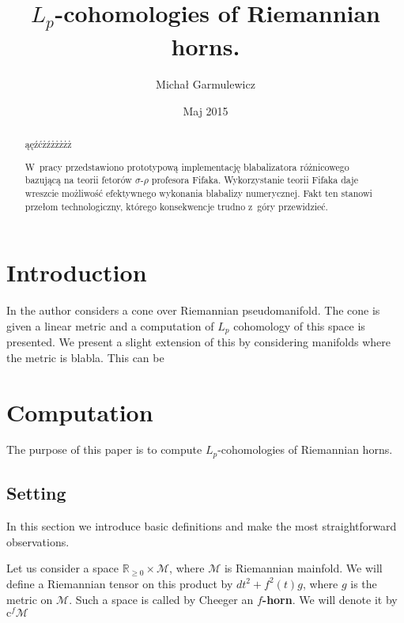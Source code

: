 \documentclass[licencjacka]{pracamgr}
\author{Michał Garmulewicz}
\title{$L_p$-cohomologies of Riemannian horns.}
\date{Maj 2015}
\begin{document}
\maketitle

\begin{abstract}
ąęźćżźżżżżż

  W~pracy przedstawiono prototypową implementację blabalizatora
  różnicowego bazującą na teorii fetorów $\sigma$-$\rho$ profesora
  Fifaka.  Wykorzystanie teorii Fifaka daje wreszcie możliwość
  efektywnego wykonania blabalizy numerycznej.  Fakt ten stanowi
  przełom technologiczny, którego konsekwencje trudno z~góry
  przewidzieć.
\end{abstract}

\tableofcontents

\chapter*{Introduction}

In \cite{weber} the author considers a cone over Riemannian pseudomanifold.
The cone is given a linear metric and a computation of $L_p$ cohomology of
this space is presented. We present a slight extension of this by considering
manifolds where the metric is blabla. This can be 



\chapter*{Computation}

The purpose of this paper is to compute $L_p$-cohomologies of Riemannian horns.


\section{Setting}
In this section we introduce basic definitions and make the most straightforward 
observations.


Let us consider a space $ \mathbb{R}_{\geq 0} \times \mathcal{M} $, where
$\mathcal{M} $ is Riemannian mainfold. We will define a Riemannian tensor on
this product by $dt^2 + f^{2}(t)g $, where $g$ is the metric on $\mathcal{M}$.
Such a space is called by Cheeger an \textbf{$f$-horn}. We will denote it by
$\mathrm{c}^f \mathcal{M}$
\end{document}
